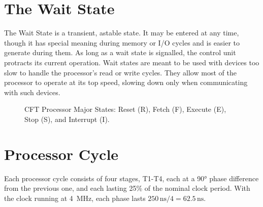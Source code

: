\section{The Wait State}

The Wait State is a transient, astable state. It may be entered at any time,
though it has special meaning during memory or I/O cycles and is easier to
generate during them. As long as a wait state is signalled, the control unit
protracts its current operation. Wait states are meant to be used with devices
too slow to handle the processor's read or write cycles. They allow most of the
processor to operate at its top speed, slowing down only when communicating
with such devices.





\begin{figure}
  \centering
  \caption[CFT Processor Major States]{\label{hard:proc:major-states}CFT Processor Major States:
    Reset (R), Fetch (F), Execute (E), Stop (S), and Interrupt (I).}
\end{figure}


\section{Processor Cycle}

Each processor cycle consists of four stages, T1-T4, each at a 90°
phase difference from the previous one, and each lasting 25\% of the
nominal clock period. With the clock running at 4~MHz, each phase
lasts $250\,\mbox{ns}/4 = 62.5\,\mbox{ns}$.

